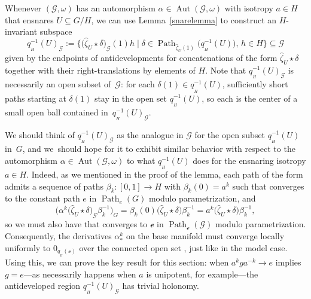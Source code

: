 \documentclass[pdftex]{sigma}
\numberwithin{equation}{section}
\theoremstyle{definition}
\DeclareMathOperator{\Aut}{\mathrm{Aut}}
\DeclareMathOperator{\Path}{Path}
\begin{document}
Whenever $(\mathscr{G},\omega)$ has an automorphism $\alpha\in\Aut(\mathscr{G},\omega)$ with isotropy $a\in H$ that ensnares $U\subseteq G/H$, we can use Lemma~\ref{snarelemma} to construct an $H$-invariant subspace \[q_{{}_H}^{-1}(U)_\mathscr{G}:=\bigl\{\bigl(\hat{\zeta}_U\star\delta\bigr)_\mathscr{G}(1)h\mid \delta\in\Path_{\hat{\zeta}_U(1)}\bigl(q_{{}_H}^{-1}(U)\bigr),\,h\in H\bigl\}\subseteq\mathscr{G}\] given by the endpoints of antidevelopments for concatenations of the form $\hat{\zeta}_U\star\delta$ together with their right-translations by elements of $H$. Note that $q_{{}_H}^{-1}(U)_\mathscr{G}$ is necessarily an open subset of~$\mathscr{G}$: for each $\delta(1)\in q_{{}_H}^{-1}(U)$, sufficiently short paths starting at $\delta(1)$ stay in the open set $q_{{}_H}^{-1}(U)$, so each  is the center of a small open ball contained in~$q_{{}_H}^{-1}(U)_\mathscr{G}$.

We should think of $q_{{}_H}^{-1}(U)_\mathscr{G}$ as the analogue in $\mathscr{G}$ for the open subset $q_{{}_H}^{-1}(U)$ in~$G$, and we~should hope for it to exhibit similar behavior with respect to the automorphism $\alpha\in\Aut(\mathscr{G},\omega)$ to what $q_{{}_H}^{-1}(U)$ does for the ensnaring isotropy $a\in H$. Indeed, as we mentioned in the proof of the lemma, each path of the form  admits a sequence of paths $\beta_k\colon [0,1]\to H$ with $\beta_k(0)=a^k$ such that  converges to the constant path $e$ in $\Path_e(G)$ modulo parametrization, and \[\bigl(\alpha^k\bigl(\hat{\zeta}_U\star\delta\bigr)_\mathscr{G}\beta_k^{-1}\bigr)_G =\beta_k(0)\bigl(\hat{\zeta}_U\star\delta\bigr)\beta_k^{-1} =a^k\bigl(\hat{\zeta}_U\star\delta\bigr)\beta_k^{-1},
\] so we must also have that  converges to $\mathscr{e}$ in $\Path_\mathscr{e}(\mathscr{G})$ modulo parametrization. Consequently, the derivatives $\alpha^k_*$ on the base manifold must converge locally uniformly to $0_{q_{{}_H}(\mathscr{e})}$ over the connected open set , just like in the model case. Using this, we can prove the key result for this section: when $a^kga^{-k}\rightarrow e$ implies $g=e$---as necessarily happens when $a$ is unipotent, for example---the antideveloped region $q_{{}_H}^{-1}(U)_\mathscr{G}$ has trivial holonomy.
\end{document}

